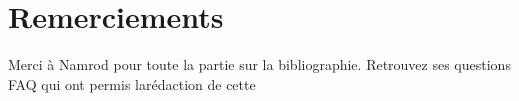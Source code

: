 \thispagestyle{empty}
\chapter*{Remerciements}
Merci à Namrod pour toute la partie sur la bibliographie. Retrouvez ses questions FAQ qui ont permis larédaction de cette
